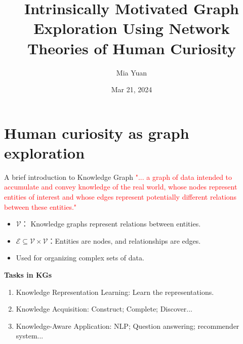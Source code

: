 \documentclass{beamer}
\title{Intrinsically Motivated Graph Exploration Using Network Theories of Human Curiosity}
\date{Mar 21, 2024}
\author{Mia Yuan}
\begin{document}
\begin{frame}
\titlepage
\end{frame}



\section{Human curiosity as graph exploration}

\begin{frame}{A brief introduction to Knowledge Graph}
\textcolor{red}{"... a graph of data intended to accumulate and convey knowledge of the real world, whose nodes represent entities of interest and whose edges represent potentially different relations between these entities."}
\begin{itemize}
    \item $\mathcal{V}$： Knowledge graphs represent relations between entities.
    \item $\mathcal{E}\subseteq \mathcal{V}\times \mathcal{V}$：Entities are nodes, and relationships are edges.
    \item Used for organizing complex sets of data.
\end{itemize}
\textbf{Tasks in KGs}
\begin{enumerate}
	\item Knowledge Representation Learning: Learn the representations.
	\item Knowledge Acquisition: Construct; Complete; Discover...
	\item Knowledge-Aware Application: NLP; Question answering; recommender system...
\end{enumerate}
\end{frame}
\end{document}

